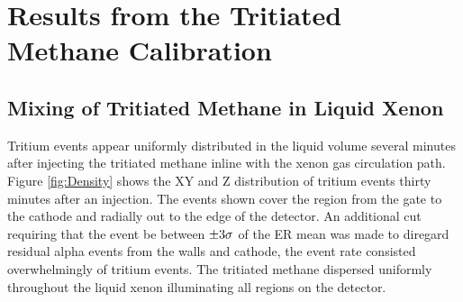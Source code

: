 
\section{Results from the Tritiated Methane Calibration}



\subsection{Mixing of Tritiated Methane in Liquid Xenon}

Tritium events appear uniformly distributed in the liquid volume several minutes after injecting the tritiated methane inline with the xenon gas circulation path. Figure \ref{fig:Density} shows the XY and Z distribution of tritium events thirty minutes after an injection. The events shown cover the region from the gate to the cathode and radially out to the edge of the detector. An additional cut requiring that the event be between $\rm \pm 3 \sigma$ of the ER mean was made to diregard residual alpha events from the walls and cathode, the event rate consisted overwhelmingly of tritium events. The tritiated methane dispersed uniformly throughout the liquid xenon illuminating all regions on the detector. 
 

